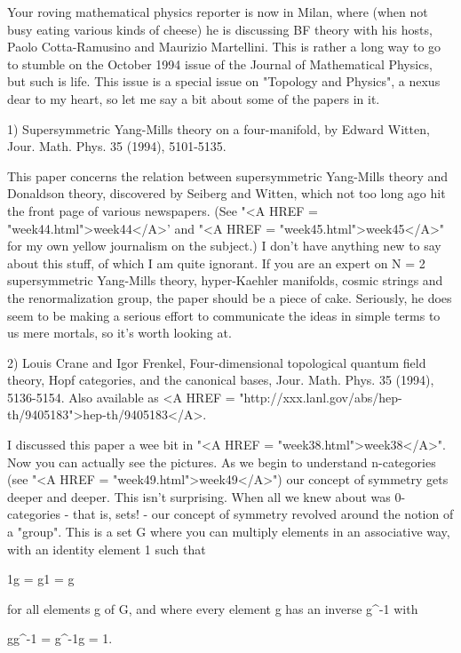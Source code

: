 

Your roving mathematical physics reporter is now in Milan,
where (when not busy eating various kinds of cheese) he
is discussing BF theory with his hosts, Paolo Cotta-Ramusino
and Maurizio Martellini.  This is rather a long way to go to
stumble on the October 1994 issue of the Journal of Mathematical
Physics, but such is life.  This issue is a special issue on 
"Topology and Physics", a nexus dear to my heart, so let me
say a bit about some of the papers in it.

1) Supersymmetric Yang-Mills theory on a four-manifold, by
Edward Witten, Jour. Math. Phys. 35 (1994), 5101-5135.

This paper concerns the relation between supersymmetric Yang-Mills
theory and Donaldson theory, discovered by Seiberg and Witten,
which not too long ago hit the front page of various newspapers.
(See "<A HREF = "week44.html">week44</A>' and "<A HREF = "week45.html">week45</A>" for my own yellow journalism on the
subject.)  I don't have anything new to say about this stuff, of 
which I am quite ignorant.   If you are an expert on N = 2 supersymmetric
Yang-Mills theory, hyper-Kaehler manifolds, cosmic strings and the
renormalization group, the paper should be a piece of cake.  Seriously,
he does seem to be making a serious effort to communicate the
ideas in simple terms to us mere mortals, so it's worth looking at.

2) Louis Crane and Igor Frenkel,
Four-dimensional topological quantum field theory, Hopf
categories, and the canonical bases, Jour. Math. Phys. 35 (1994), 5136-5154.
Also available as
<A HREF = "http://xxx.lanl.gov/abs/hep-th/9405183">hep-th/9405183</A>.   



I discussed this paper a wee bit in "<A HREF = "week38.html">week38</A>".  
Now you can actually see the pictures.   As we begin to understand 
n-categories (see
"<A HREF = "week49.html">week49</A>") our concept of symmetry gets deeper and deeper.  This
isn't surprising.  When all we knew about was 0-categories - that
is, sets! - our concept of symmetry revolved around the notion of
a "group".  This is a set G where you can multiply elements in an
associative way, with an identity element 1 such that 

1g = g1 = g

for all elements g of G, and where every element g has an inverse
g^{-1} with 

gg^{-1} = g^{-1}g = 1.  

